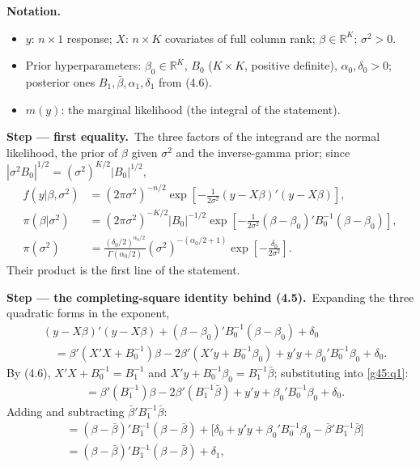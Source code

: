 \documentclass[11pt,a4paper]{article}
\newenvironment{notacao}{\par\smallskip\noindent\textbf{Notation.}\begin{itemize}[leftmargin=1.4em,topsep=1pt,itemsep=0pt]\small}{\end{itemize}}
\newcommand{\passo}[2]{\par\smallskip\noindent\textbf{Step --- #1.}~#2}
\begin{document}
\begin{sol}
\begin{notacao}
\item $y$: $n\times1$ response; $X$: $n\times K$ covariates of full column rank; $\beta\in\mathbb R^K$; $\sigma^2>0$.
\item Prior hyperparameters: $\beta_0\in\mathbb R^K$, $B_0$ ($K\times K$, positive definite), $\alpha_0,\delta_0>0$; posterior ones $B_1,\bar\beta,\alpha_1,\delta_1$ from (4.6).
\item $m(y)$: the marginal likelihood (the integral of the statement).
\end{notacao}
\passo{first equality}{The three factors of the integrand are the normal likelihood, the prior of $\beta$ given $\sigma^2$ and the inverse-gamma prior; since $|\sigma^2B_0|^{1/2}=(\sigma^2)^{K/2}|B_0|^{1/2}$,
\begin{align}
f(y|\beta,\sigma^2)&=(2\pi\sigma^2)^{-n/2}\exp\left[-\tfrac{1}{2\sigma^2}(y-X\beta)'(y-X\beta)\right],\label{g45:f}\\
\pi(\beta|\sigma^2)&=(2\pi\sigma^2)^{-K/2}|B_0|^{-1/2}\exp\left[-\tfrac{1}{2\sigma^2}(\beta-\beta_0)'B_0^{-1}(\beta-\beta_0)\right],\label{g45:pb}\\
\pi(\sigma^2)&=\frac{(\delta_0/2)^{\alpha_0/2}}{\Gamma(\alpha_0/2)}(\sigma^2)^{-(\alpha_0/2+1)}\exp\left[-\tfrac{\delta_0}{2\sigma^2}\right].\label{g45:ps}
\end{align}
Their product is the first line of the statement.}
\passo{the completing-square identity behind (4.5)}{Expanding the three quadratic forms in the exponent,
\begin{align}
&(y-X\beta)'(y-X\beta)+(\beta-\beta_0)'B_0^{-1}(\beta-\beta_0)+\delta_0\nonumber\\
&\quad=\beta'(X'X+B_0^{-1})\beta-2\beta'(X'y+B_0^{-1}\beta_0)+y'y+\beta_0'B_0^{-1}\beta_0+\delta_0.\label{g45:q1}
\end{align}
By (4.6), $X'X+B_0^{-1}=B_1^{-1}$ and $X'y+B_0^{-1}\beta_0=B_1^{-1}\bar\beta$; substituting into \eqref{g45:q1}:
\begin{align}
&=\beta'(B_1^{-1})\beta-2\beta'(B_1^{-1}\bar\beta)+y'y+\beta_0'B_0^{-1}\beta_0+\delta_0.\label{g45:q2}
\end{align}
Adding and subtracting $\bar\beta'B_1^{-1}\bar\beta$:
\begin{align}
&=(\beta-\bar\beta)'B_1^{-1}(\beta-\bar\beta)+\big[\delta_0+y'y+\beta_0'B_0^{-1}\beta_0-\bar\beta'B_1^{-1}\bar\beta\big]\label{g45:q3}\\
&=(\beta-\bar\beta)'B_1^{-1}(\beta-\bar\beta)+\delta_1,\label{g45:q4}

\end{align}}
\end{sol}
\end{document}

